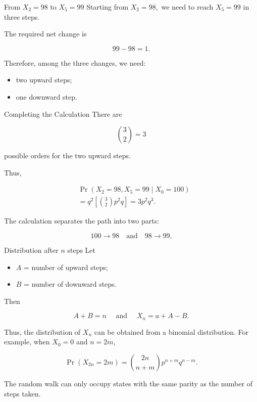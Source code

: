 \documentclass[
  ignorenonframetext,
  aspectratio=169,
]{beamer}
\providecommand{\tightlist}{%
  \setlength{\itemsep}{0pt}\setlength{\parskip}{0pt}}
\begin{document}
\begin{frame}{From \(X_2=98\) to \(X_5=99\)}
\protect{}\label{from-x_298-to-x_599}
Starting from \(X_2=98,\) we need to reach \(X_5=99\) in three steps.

The required net change is

\[
99-98=1.
\]

Therefore, among the three changes, we need:

\begin{itemize}
\tightlist
\item
  two upward steps;
\item
  one downward step.
\end{itemize}
\end{frame}

\begin{frame}{Completing the Calculation}
\protect{}\label{completing-the-calculation}
There are

\[
{3\choose2}=3
\]

possible orders for the two upward steps.

Thus,

\[
\begin{aligned}
&\Pr(X_2=98,X_5=99\mid X_0=100)\\
&=q^2
\left[
{3\choose2}p^2q
\right]=\boxed{3p^2q^3}.
\end{aligned}
\]

The calculation separates the path into two parts:

\[
100\longrightarrow98
\quad\text{and}\quad
98\longrightarrow99.
\]
\end{frame}

\begin{frame}{Distribution after \(n\) steps}
\protect{}\label{distribution-after-n-steps}
Let

\begin{itemize}
\tightlist
\item
  \(A\) = number of upward steps;
\item
  \(B\) = number of downward steps.
\end{itemize}

Then

\[
A+B=n \quad \text{ and }\quad X_n=a+A-B.
\]

Thus, the distribution of \(X_n\) can be obtained from a binomial
distribution. For example, when \(X_0=0\) and \(n=2m\),

\[
\Pr(X_{2n}=2m)
={2n\choose n+m}p^{n+m}q^{n-m}.
\]

The random walk can only occupy states with the same parity as the
number of steps taken.
\end{frame}
\end{document}
